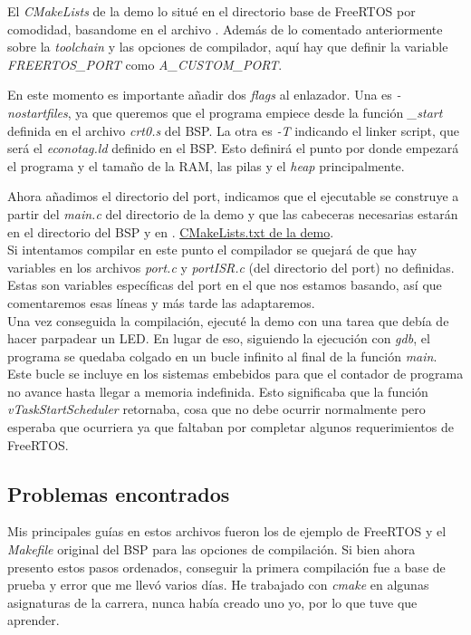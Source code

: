 El \emph{CMakeLists} de la demo lo situé en el directorio base de FreeRTOS por comodidad, basandome en el archivo . Además de lo comentado anteriormente sobre la \emph{toolchain} y las opciones de compilador, aquí hay que definir la variable \emph{FREERTOS\_PORT} como \emph{A\_CUSTOM\_PORT}.

En este momento es importante añadir dos \emph{flags} al enlazador. Una es \emph{-nostartfiles}, ya que queremos que el programa empiece desde la función \emph{\_start} definida en el archivo \emph{crt0.s} del BSP. La otra es \emph{-T} indicando el linker script, que será el \emph{econotag.ld} definido en el BSP. Esto definirá el punto por donde empezará el programa y el tamaño de la RAM, las pilas y el \emph{heap} principalmente.

Ahora añadimos el directorio del port, indicamos que el ejecutable se construye a partir del \emph{main.c} del directorio de la demo y que las cabeceras necesarias estarán en el directorio del BSP y en .
\href{https://github.com/epaubert/FreeRTOS-TFG/blob/main/FreeRTOS/CMakeLists.txt}{CMakeLists.txt de la demo}.\\

Si intentamos compilar en este punto el compilador se quejará de que hay variables en los archivos \emph{port.c} y \emph{portISR.c} (del directorio del port) no definidas. Estas son variables específicas del port en el que nos estamos basando, así que comentaremos esas líneas y más tarde las adaptaremos.\\

Una vez conseguida la compilación, ejecuté la demo con una tarea que debía de hacer parpadear un LED. En lugar de eso, siguiendo la ejecución con \emph{gdb}, el programa se quedaba colgado en un bucle infinito al final de la función \emph{main}. Este bucle se incluye en los sistemas embebidos para que el contador de programa no avance hasta llegar a memoria indefinida. Esto significaba que la función \emph{vTaskStartScheduler} retornaba, cosa que no debe ocurrir normalmente pero esperaba que ocurriera ya que faltaban por completar algunos requerimientos de FreeRTOS.

\subsection{Problemas encontrados}
Mis principales guías en estos archivos fueron los de ejemplo de FreeRTOS y el \emph{Makefile} original del BSP para las opciones de compilación. Si bien ahora presento estos pasos ordenados, conseguir la primera compilación fue a base de prueba y error que me llevó varios días. He trabajado con \emph{cmake} en algunas asignaturas de la carrera, nunca había creado uno yo, por lo que tuve que aprender.

